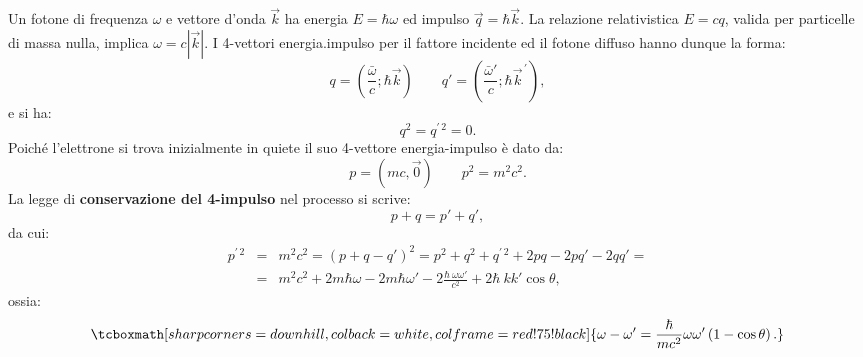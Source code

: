 \documentclass[a4paper,12pt,oneside]{book}
\begin{document}
	
Un fotone di frequenza $\omega$ e vettore d'onda $\vec{k}$ ha energia $E = \hbar \omega$ ed impulso $\vec{q}= \hbar \vec{k}$. La relazione relativistica $E=cq$, valida per particelle di massa nulla, implica $\omega = c|\vec{k}|$. I 4-vettori energia.impulso per il fattore incidente ed il fotone diffuso hanno dunque la forma:
	\begin{equation}
		q=\left(\frac{\bar \omega}{c}; \hbar \vec{k} \right)\qquad q' = \left(\frac{\bar \omega'}{c}; \hbar {\vec{k}}^{\, \prime}\right),
	\end{equation}
e si ha:
	\begin{equation}
		q^2 = q^{\prime \, 2}=0.
	\end{equation}
Poiché l'elettrone si trova inizialmente in quiete il suo 4-vettore energia-impulso è dato da:
	\begin{equation}
		p=\left(mc, \vec{0} \right)\qquad p^2 =m^2 c^2.
	\end{equation}
La legge di \textbf{conservazione del 4-impulso} nel processo si scrive:
	\begin{equation}
		p+q=p'+q',
	\end{equation}
da cui:
	\begin{eqnarray}
	p^{\prime \, 2} &=& m^2 c^2 = \left( p +q -q'\right)^2= p^2 + q^2 +q^{\prime \, 2}+ 2pq - 2pq' -2 qq'= \nonumber \\
	&=& m^2c^2 + 2m\hbar \omega - 2m \hbar \omega ' - 2 \frac{\hbar \ \omega \omega '}{c^2}+2 \hbar \ k k'  \cos \theta ,
	\end{eqnarray}
ossia:
	\begin{equation}
		\tcboxmath[sharp corners=downhill ,colback=white,colframe=red!75!black]{
			\omega - \omega ' =\frac{\hbar}{m c^2} \omega \omega ' \left( 1-\cos \theta \right).
			}
	\label{eq:cap1_3}
	\end{equation}
\end{document}
